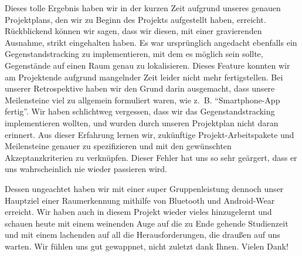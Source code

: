 Dieses tolle Ergebnis haben wir in der kurzen Zeit aufgrund unseres genauen Projektplans, den wir zu Beginn des Projekts aufgestellt haben, erreicht. Rückblickend können wir sagen, dass wir diesen, mit einer gravierenden Ausnahme, strikt eingehalten haben. Es war ursprünglich angedacht ebenfalls ein Gegenstandstracking zu implementieren, mit dem es möglich sein sollte, Gegenstände auf einen Raum genau zu lokalisieren. Dieses Feature konnten wir am Projektende aufgrund mangelnder Zeit leider nicht mehr fertigstellen. Bei unserer Retrospektive haben wir den Grund darin ausgemacht, dass unsere Meilensteine viel zu allgemein formuliert waren, wie z.~B. “Smartphone-App fertig”. Wir haben schlichtweg vergessen, dass wir das Gegenstandstracking implementieren wollten, und wurden durch unseren Projektplan nicht daran erinnert. Aus dieser Erfahrung lernen wir, zukünftige Projekt-Arbeitspakete und Meilensteine genauer zu spezifizieren und mit den gewünschten Akzeptanzkriterien zu verknüpfen. Dieser Fehler hat uns so sehr geärgert, dass er uns wahrscheinlich nie wieder passieren wird.

Dessen ungeachtet haben wir mit einer super Gruppenleistung dennoch unser Hauptziel einer Raumerkennung mithilfe von Bluetooth und Android-Wear erreicht. Wir haben auch in diesem Projekt wieder vieles hinzugelernt und schauen heute mit einem weinenden Auge auf die zu Ende gehende Studienzeit und mit einem lachenden auf all die Herausforderungen, die draußen auf uns warten. Wir fühlen uns gut gewappnet, nicht zuletzt dank Ihnen. Vielen Dank!
